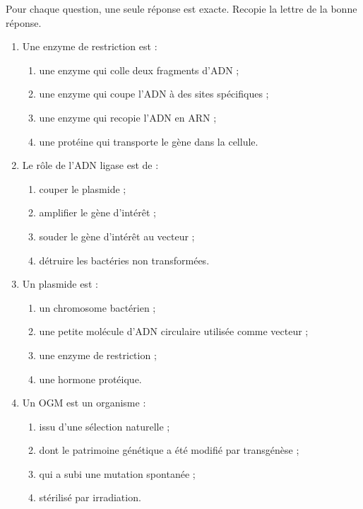 \documentclass[11pt]{article}
\begin{document}
\begin{exercice}
Pour chaque question, une seule réponse est exacte. Recopie la lettre de la bonne réponse.
\begin{enumerate}
\item Une enzyme de restriction est :
\begin{enumerate}
\item une enzyme qui colle deux fragments d'ADN ;
\item une enzyme qui coupe l'ADN à des sites spécifiques ;
\item une enzyme qui recopie l'ADN en ARN ;
\item une protéine qui transporte le gène dans la cellule.
\end{enumerate}
\item Le rôle de l'ADN ligase est de :
\begin{enumerate}
\item couper le plasmide ;
\item amplifier le gène d'intérêt ;
\item souder le gène d'intérêt au vecteur ;
\item détruire les bactéries non transformées.
\end{enumerate}
\item Un plasmide est :
\begin{enumerate}
\item un chromosome bactérien ;
\item une petite molécule d'ADN circulaire utilisée comme vecteur ;
\item une enzyme de restriction ;
\item une hormone protéique.
\end{enumerate}
\item Un OGM est un organisme :
\begin{enumerate}
\item issu d'une sélection naturelle ;
\item dont le patrimoine génétique a été modifié par transgénèse ;
\item qui a subi une mutation spontanée ;
\item stérilisé par irradiation.
\end{enumerate}
\end{enumerate}
\end{exercice}
\end{document}
